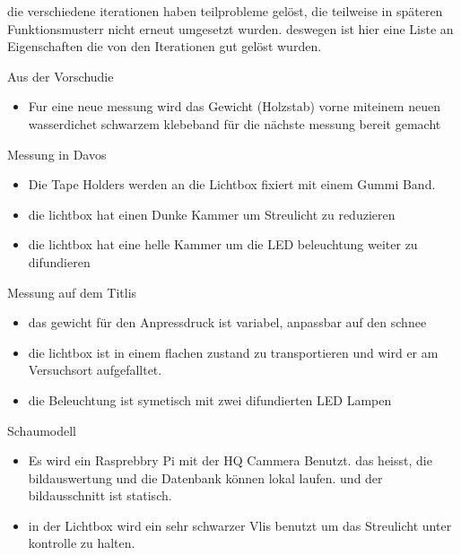 die verschiedene iterationen haben teilprobleme gelöst, die teilweise in späteren Funktionsmusterr nicht erneut umgesetzt wurden. deswegen ist hier eine Liste an Eigenschaften die von den Iterationen gut gelöst wurden.

Aus der Vorschudie 
\begin{itemize}
\item Fur eine neue messung wird das Gewicht (Holzstab) vorne miteinem neuen wasserdichet schwarzem klebeband für die nächste messung bereit gemacht
\end{itemize}
Messung in Davos
\begin{itemize}
\item Die Tape Holders werden an die Lichtbox fixiert mit einem Gummi Band.
\item die lichtbox hat einen Dunke Kammer um Streulicht zu reduzieren
\item die lichtbox hat eine helle Kammer um die LED beleuchtung weiter zu difundieren
\end{itemize}
Messung auf dem Titlis
\begin{itemize}
\item das gewicht für den Anpressdruck ist variabel, anpassbar auf den schnee
\item die lichtbox ist in einem flachen zustand zu transportieren und wird er am Versuchsort aufgefalltet.
\item die Beleuchtung ist symetisch mit zwei difundierten LED Lampen
\end{itemize}
Schaumodell
\begin{itemize}
\item Es wird ein Rasprebbry Pi mit der HQ Cammera Benutzt. das heisst, die bildauswertung und die Datenbank können lokal laufen. und der bildausschnitt ist statisch.
\item in der Lichtbox wird ein sehr schwarzer Vlis benutzt um das Streulicht unter kontrolle zu halten.
\end{itemize}
